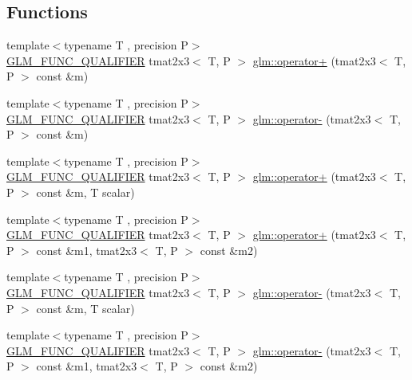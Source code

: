 \subsection*{Functions}
\begin{DoxyCompactItemize}
\item 
{\footnotesize template$<$typename T , precision P$>$ }\\\mbox{\hyperlink{setup_8hpp_a33fdea6f91c5f834105f7415e2a64407}{G\+L\+M\+\_\+\+F\+U\+N\+C\+\_\+\+Q\+U\+A\+L\+I\+F\+I\+ER}} tmat2x3$<$ T, P $>$ \mbox{\hyperlink{namespaceglm_adbd6031dd5be1df1ba21e09770d80baa}{glm\+::operator+}} (tmat2x3$<$ T, P $>$ const \&m)
\item 
{\footnotesize template$<$typename T , precision P$>$ }\\\mbox{\hyperlink{setup_8hpp_a33fdea6f91c5f834105f7415e2a64407}{G\+L\+M\+\_\+\+F\+U\+N\+C\+\_\+\+Q\+U\+A\+L\+I\+F\+I\+ER}} tmat2x3$<$ T, P $>$ \mbox{\hyperlink{namespaceglm_ac0531b9437e7358ffddc22b5391ddcca}{glm\+::operator-\/}} (tmat2x3$<$ T, P $>$ const \&m)
\item 
{\footnotesize template$<$typename T , precision P$>$ }\\\mbox{\hyperlink{setup_8hpp_a33fdea6f91c5f834105f7415e2a64407}{G\+L\+M\+\_\+\+F\+U\+N\+C\+\_\+\+Q\+U\+A\+L\+I\+F\+I\+ER}} tmat2x3$<$ T, P $>$ \mbox{\hyperlink{namespaceglm_a111f2541c2c682598588071f1afda6ec}{glm\+::operator+}} (tmat2x3$<$ T, P $>$ const \&m, T scalar)
\item 
{\footnotesize template$<$typename T , precision P$>$ }\\\mbox{\hyperlink{setup_8hpp_a33fdea6f91c5f834105f7415e2a64407}{G\+L\+M\+\_\+\+F\+U\+N\+C\+\_\+\+Q\+U\+A\+L\+I\+F\+I\+ER}} tmat2x3$<$ T, P $>$ \mbox{\hyperlink{namespaceglm_a7578fa8147ab1357184c6043278f38e5}{glm\+::operator+}} (tmat2x3$<$ T, P $>$ const \&m1, tmat2x3$<$ T, P $>$ const \&m2)
\item 
{\footnotesize template$<$typename T , precision P$>$ }\\\mbox{\hyperlink{setup_8hpp_a33fdea6f91c5f834105f7415e2a64407}{G\+L\+M\+\_\+\+F\+U\+N\+C\+\_\+\+Q\+U\+A\+L\+I\+F\+I\+ER}} tmat2x3$<$ T, P $>$ \mbox{\hyperlink{namespaceglm_a41c3d1ca0057b34f39b9cb74d3d50489}{glm\+::operator-\/}} (tmat2x3$<$ T, P $>$ const \&m, T scalar)
\item 
{\footnotesize template$<$typename T , precision P$>$ }\\\mbox{\hyperlink{setup_8hpp_a33fdea6f91c5f834105f7415e2a64407}{G\+L\+M\+\_\+\+F\+U\+N\+C\+\_\+\+Q\+U\+A\+L\+I\+F\+I\+ER}} tmat2x3$<$ T, P $>$ \mbox{\hyperlink{namespaceglm_a2a06e2f9118332e9be75b7d6e9b7810f}{glm\+::operator-\/}} (tmat2x3$<$ T, P $>$ const \&m1, tmat2x3$<$ T, P $>$ const \&m2)

\end{DoxyCompactItemize}
